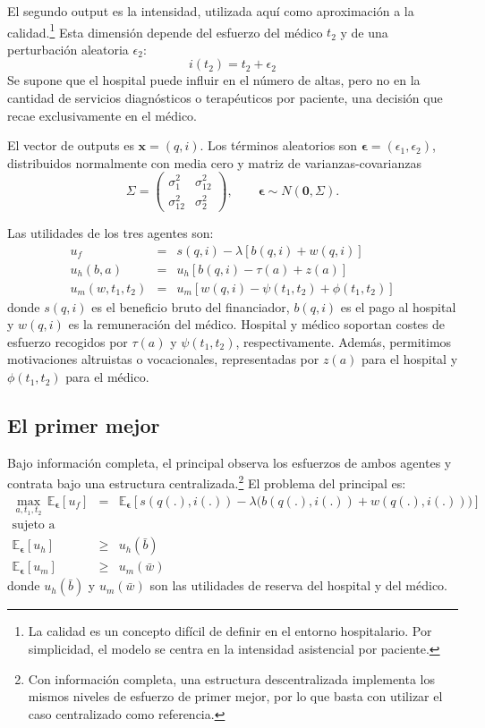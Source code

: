 ﻿\documentclass[12pt,letterpaper]{article}
\begin{document}
El segundo output es la intensidad, utilizada aqu\'i como aproximaci\'on a la calidad.\footnote{La calidad es un concepto dif\'icil de definir en el entorno hospitalario. Por simplicidad, el modelo se centra en la intensidad asistencial por paciente.} Esta dimensi\'on depende del esfuerzo del m\'edico $t_2$ y de una perturbaci\'on aleatoria $\epsilon_2$:
\begin{equation*}\label{eq:ies}
  i(t_2)=t_2+\epsilon_2
\end{equation*}
Se supone que el hospital puede influir en el n\'umero de altas, pero no en la cantidad de servicios diagn\'osticos o terap\'euticos por paciente, una decisi\'on que recae exclusivamente en el m\'edico.

El vector de outputs es $\bm{x}=(q,i)$. Los t\'erminos aleatorios son $\bm{\epsilon}=(\epsilon_1,\epsilon_2)$, distribuidos normalmente con media cero y matriz de varianzas-covarianzas
\[
\Sigma=
\begin{pmatrix}
\sigma_1^2 & \sigma_{12}^2 \\
\sigma_{12}^2 & \sigma_2^2
\end{pmatrix},
\qquad
\bm{\epsilon}\sim N(\mathbf{0},\Sigma).
\]

Las utilidades de los tres agentes son:
\begin{eqnarray*}\label{utiles}
u_f &=& s(q,i)-\lambda[b(q,i)+w(q,i)]\\
u_h(b,a) &=& u_h[b(q,i)-\tau(a)+z(a)]\\
u_m(w,t_1,t_2) &=& u_m[w(q,i)-\psi(t_1,t_2)+\phi(t_1,t_2)]
\end{eqnarray*}
donde $s(q,i)$ es el beneficio bruto del financiador, $b(q,i)$ es el pago al hospital y $w(q,i)$ es la remuneraci\'on del m\'edico. Hospital y m\'edico soportan costes de esfuerzo recogidos por $\tau(a)$ y $\psi(t_1,t_2)$, respectivamente. Adem\'as, permitimos motivaciones altruistas o vocacionales, representadas por $z(a)$ para el hospital y $\phi(t_1,t_2)$ para el m\'edico.

\subsection{El primer mejor}
Bajo informaci\'on completa, el principal observa los esfuerzos de ambos agentes y contrata bajo una estructura centralizada.\footnote{Con informaci\'on completa, una estructura descentralizada implementa los mismos niveles de esfuerzo de primer mejor, por lo que basta con utilizar el caso centralizado como referencia.} El problema del principal es:
\begin{eqnarray*}\label{maxf0es}
\nonumber \max\limits_{a,t_1,t_2}\,
\mathbb{E}_{\bm{\epsilon}}[u_f]
&=&
\mathbb{E}_{\bm{\epsilon}}
\left[
s(q(.),i(.))-\lambda\big(b(q(.),i(.))+w(q(.),i(.))\big)
\right]\\
\nonumber \text{sujeto a }\\
\mathbb{E}_{\bm{\epsilon}}[u_h] &\geq& u_h(\bar{b})\\
\mathbb{E}_{\bm{\epsilon}}[u_m] &\geq& u_m(\bar{w})
\end{eqnarray*}
donde $u_h(\bar{b})$ y $u_m(\bar{w})$ son las utilidades de reserva del hospital y del m\'edico.
\end{document}
